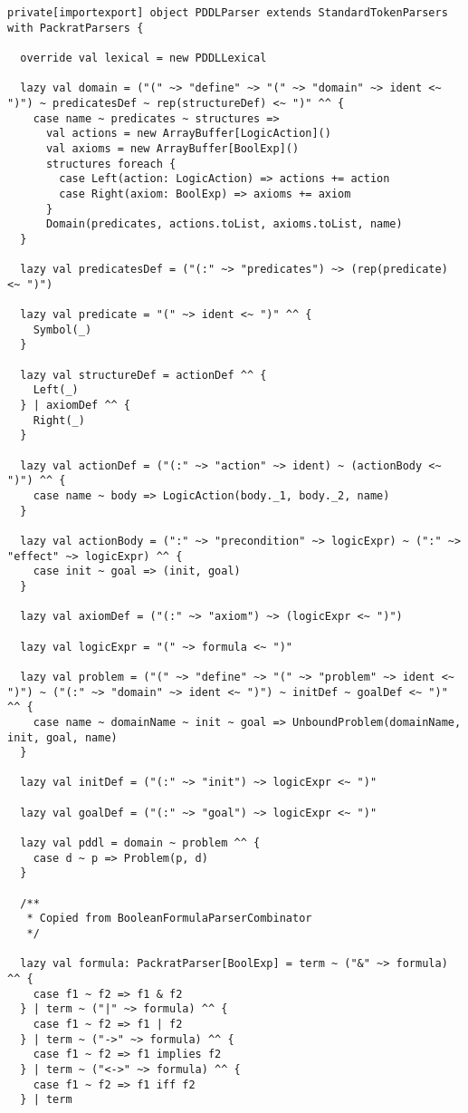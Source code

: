 \begin{lstlisting}[caption=PDDLParser, label=source_parser]
 private[importexport] object PDDLParser extends StandardTokenParsers with PackratParsers {

  override val lexical = new PDDLLexical

  lazy val domain = ("(" ~> "define" ~> "(" ~> "domain" ~> ident <~ ")") ~ predicatesDef ~ rep(structureDef) <~ ")" ^^ {
    case name ~ predicates ~ structures =>
      val actions = new ArrayBuffer[LogicAction]()
      val axioms = new ArrayBuffer[BoolExp]()
      structures foreach {
        case Left(action: LogicAction) => actions += action
        case Right(axiom: BoolExp) => axioms += axiom
      }
      Domain(predicates, actions.toList, axioms.toList, name)
  }

  lazy val predicatesDef = ("(:" ~> "predicates") ~> (rep(predicate) <~ ")")

  lazy val predicate = "(" ~> ident <~ ")" ^^ {
    Symbol(_)
  }

  lazy val structureDef = actionDef ^^ {
    Left(_)
  } | axiomDef ^^ {
    Right(_)
  }

  lazy val actionDef = ("(:" ~> "action" ~> ident) ~ (actionBody <~ ")") ^^ {
    case name ~ body => LogicAction(body._1, body._2, name)
  }

  lazy val actionBody = (":" ~> "precondition" ~> logicExpr) ~ (":" ~> "effect" ~> logicExpr) ^^ {
    case init ~ goal => (init, goal)
  }

  lazy val axiomDef = ("(:" ~> "axiom") ~> (logicExpr <~ ")")

  lazy val logicExpr = "(" ~> formula <~ ")"

  lazy val problem = ("(" ~> "define" ~> "(" ~> "problem" ~> ident <~ ")") ~ ("(:" ~> "domain" ~> ident <~ ")") ~ initDef ~ goalDef <~ ")" ^^ {
    case name ~ domainName ~ init ~ goal => UnboundProblem(domainName, init, goal, name)
  }

  lazy val initDef = ("(:" ~> "init") ~> logicExpr <~ ")"

  lazy val goalDef = ("(:" ~> "goal") ~> logicExpr <~ ")"

  lazy val pddl = domain ~ problem ^^ {
    case d ~ p => Problem(p, d)
  }

  /**
   * Copied from BooleanFormulaParserCombinator
   */

  lazy val formula: PackratParser[BoolExp] = term ~ ("&" ~> formula) ^^ {
    case f1 ~ f2 => f1 & f2
  } | term ~ ("|" ~> formula) ^^ {
    case f1 ~ f2 => f1 | f2
  } | term ~ ("->" ~> formula) ^^ {
    case f1 ~ f2 => f1 implies f2
  } | term ~ ("<->" ~> formula) ^^ {
    case f1 ~ f2 => f1 iff f2
  } | term


\end{lstlisting}
